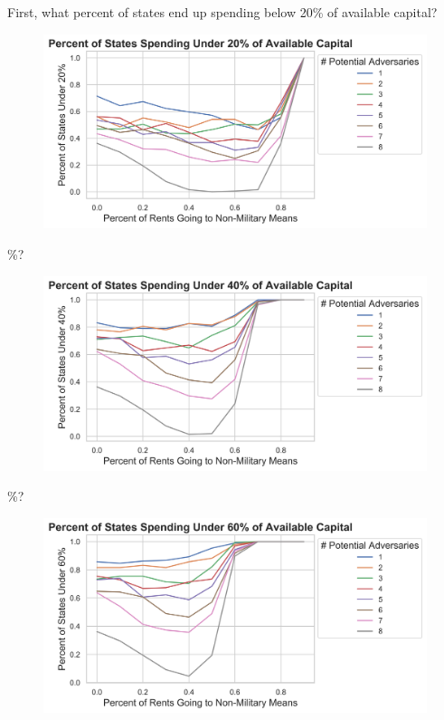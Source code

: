 \documentclass[12pt]{article}
\begin{document}
First, what percent of states end up spending below 20\% of available capital?

\begin{figure}[!ht]
    \centering
    \includegraphics[scale = 0.825]{images/sim_20.png}
    \label{sub_20}
\end{figure}

\%?

\begin{figure}[!ht]
    \centering
    \includegraphics[scale = 0.825]{images/sim_40.png}
    \label{sub_40}
\end{figure}

\newpage
{}\%?

\begin{figure}[!ht]
    \centering
    \includegraphics[scale = 0.825]{images/sim_60.png}
    \label{sub_60}
\end{figure}
\end{document}
